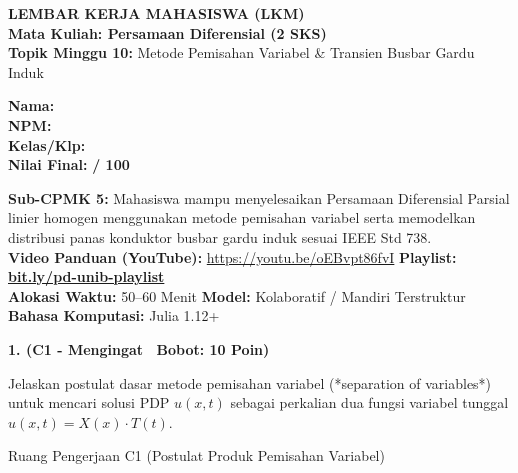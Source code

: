 \documentclass[10pt,a4paper]{article}
\begin{document}
\noindent\begin{minipage}[c]{0.68\textwidth}%
  {\large\textbf{\color{unibblue}LEMBAR KERJA MAHASISWA (LKM)}}\\[1mm]
  {\normalsize\textbf{Mata Kuliah: Persamaan Diferensial (2 SKS)}}\\[0.5mm]
  {\small\textbf{Topik Minggu 10:} Metode Pemisahan Variabel \& Transien Busbar Gardu Induk}%
\end{minipage}%
\hfill%
\begin{minipage}[c]{0.30\textwidth}%
  \begin{tcolorbox}[colback=unibblue!5,colframe=unibblue,boxrule=0.6pt,arc=2pt,left=4pt,right=4pt,top=2pt,bottom=2pt]
    \scriptsize
    \textbf{Nama:} \dotfill\\[1.2mm]
    \textbf{NPM:} \dotfill\\[1.2mm]
    \textbf{Kelas/Klp:} \dotfill\\[1.2mm]
    \textbf{Nilai Final:} \hfill \textbf{/ 100}
  \end{tcolorbox}%
\end{minipage}\par

\vspace{1.5mm}

\begin{tcolorbox}[colback=boxbg,colframe=unibgold!90!black,boxrule=0.6pt,arc=2pt,left=5pt,right=5pt,top=3pt,bottom=3pt,title=\textbf{\scriptsize Capaian Pembelajaran (Sub-CPMK 5) \& Pedoman Evaluasi OBE}]
  \scriptsize
  \textbf{Sub-CPMK 5:} Mahasiswa mampu menyelesaikan Persamaan Diferensial Parsial linier homogen menggunakan metode pemisahan variabel serta memodelkan distribusi panas konduktor busbar gardu induk sesuai IEEE Std 738.\\
  \textbf{Video Panduan (YouTube):} \url{https://youtu.be/oEBvpt86fvI} \hfill \textbf{Playlist:} \href{https://www.youtube.com/playlist?list=PLS5oOZWXZeTw}{\color{unibblue}\textbf{bit.ly/pd-unib-playlist}}\\\textbf{Alokasi Waktu:} 50--60 Menit \quad\textbar\quad \textbf{Model:} Kolaboratif / Mandiri Terstruktur \quad\textbar\quad \textbf{Bahasa Komputasi:} Julia 1.12+
\end{tcolorbox}

\vspace{1mm}

\noindent\textbf{1. (C1 - Mengingat \textbar\ Bobot: 10 Poin)}\par\vspace{0.5mm}
{\footnotesize Jelaskan postulat dasar metode pemisahan variabel (*separation of variables*) untuk mencari solusi PDP $u(x,t)$ sebagai perkalian dua fungsi variabel tunggal $u(x,t) = X(x) \cdot T(t)$.}
\begin{answerbox}{Ruang Pengerjaan C1 (Postulat Produk Pemisahan Variabel)}
  \vspace{2.0cm}
\end{answerbox}
\end{document}
